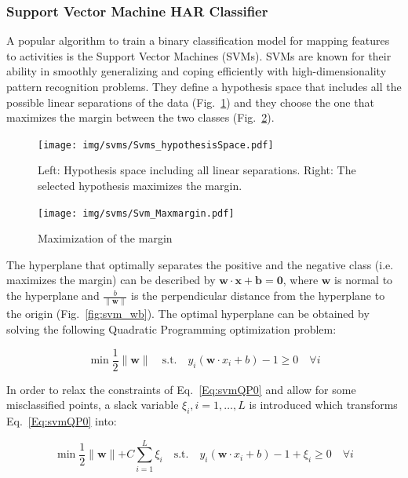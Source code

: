 \subsubsection*{{\bf Support Vector Machine HAR Classifier}}
\label{sec:SVM}

A popular algorithm to train a binary classification model for mapping
features to activities is the Support Vector Machines (SVMs). SVMs are
known for their ability in smoothly generalizing and coping
efficiently with high-dimensionality pattern recognition
problems. They define a hypothesis space that includes all the
possible linear separations of the data
(Fig.~\ref{fig:svm_hypothesisSpace}) and they choose the one that
maximizes the margin between the two classes
(Fig.~\ref{fig:svm_margin}).

\begin{figure}[h]
\centering
  \texttt{[image: img/svms/Svms\_hypothesisSpace.pdf]}
  \caption{Left: Hypothesis space including all linear separations. Right: The selected hypothesis maximizes the margin.}
  \label{fig:svm_hypothesisSpace}
\end{figure}


\begin{figure}[h]
\centering
  \texttt{[image: img/svms/Svm\_Maxmargin.pdf]}
  \caption{Maximization of the margin}
  \label{fig:svm_margin}
\end{figure}

\noindent The hyperplane that optimally separates the positive and the
negative class (i.e. maximizes the margin) can be described by
$\mathbf{w\cdot x + b = 0}$, where $\mathbf{w}$ is normal to the
hyperplane and $\frac{b}{\parallel\mathbf{w}\parallel}$ is the
perpendicular distance from the hyperplane to the origin
(Fig.~\ref{fig:svm_wb}). The optimal hyperplane can be obtained by
solving the following Quadratic Programming optimization problem:

\begin{equation}\label{Eq:svmQP0}
  \min \frac{1}{2}\parallel\mathbf{w}\parallel \quad \text{s.t.} \quad y_i(\mathbf{w}\cdot x_i + b) -1 \ge 0 \quad \forall i
\end{equation}

In order to relax the constraints of Eq.~\ref{Eq:svmQP0} and allow for
some misclassified points, a slack variable $\xi_i, i=1,\ldots,L$ is
introduced which transforms Eq.~\ref{Eq:svmQP0} into:

\begin{equation}\label{Eq:svmQPxi}
  \min \frac{1}{2}\parallel\mathbf{w}\parallel + C\sum_{i=1}^{L}\xi_i \quad \text{s.t.} \quad y_i(\mathbf{w}\cdot x_i + b) -1 +\xi_i \ge 0 \quad \forall i
\end{equation}

